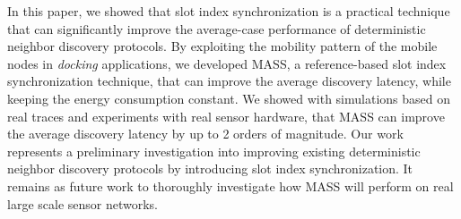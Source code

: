 \documentclass[twoside,twocolumn]{article}
\begin{document}
In this paper, we showed that slot index synchronization is a practical
technique that can significantly improve the average-case performance
of deterministic neighbor discovery protocols. By exploiting the
mobility pattern of the mobile nodes in \emph{docking} applications,
we developed MASS, a reference-based slot index synchronization
technique, that can improve the average discovery latency, while
keeping the energy consumption constant.  We showed with simulations
based on real traces and experiments with real sensor hardware, that MASS 
can improve the average discovery latency by up to 2 orders of magnitude. 
Our work represents a preliminary investigation into improving existing 
deterministic neighbor discovery protocols by introducing slot index
synchronization. It remains as future work to thoroughly investigate
how MASS will perform on real large scale sensor networks.






\end{document}
